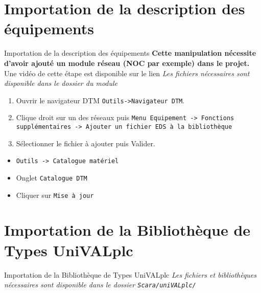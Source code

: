 \section{Importation de la description des équipements}

\begin{UPSTIManipulation}{Importation de la description des équipements}
    \textbf{Cette manipulation nécessite d'avoir ajouté un module réseau (NOC par exemple) dans le projet.}
    Une vidéo de cette étape est disponible sur le lien 
    \textit{Les fichiers nécessaires sont disponible dans le dossier du module}
        \begin{enumerate}
            \item Ouvrir le navigateur DTM \texttt{Outils->Navigateur DTM}.
            \item Clique droit sur un des réseaux puis \texttt{Menu Equipement -> Fonctions supplémentaires -> Ajouter un fichier EDS à la bibliothèque}
            \item Sélectionner le fichier à ajouter puis Valider.
        \end{enumerate}
        \begin{itemize}
            \item \texttt{Outils -> Catalogue matériel}
            \item Onglet \texttt{Catalogue DTM}
            \item Cliquer sur \texttt{Mise à jour}
        \end{itemize}
\end{UPSTIManipulation}

\section{Importation de la Bibliothèque de Types UniVALplc}

\begin{UPSTIManipulation}{Importation de la Bibliothèque de Types UniVALplc}
    \textit{Les fichiers et bibliothèques nécessaires sont disponible dans le dossier \texttt{Scara/uniVALplc/}}
\end{UPSTIManipulation}

